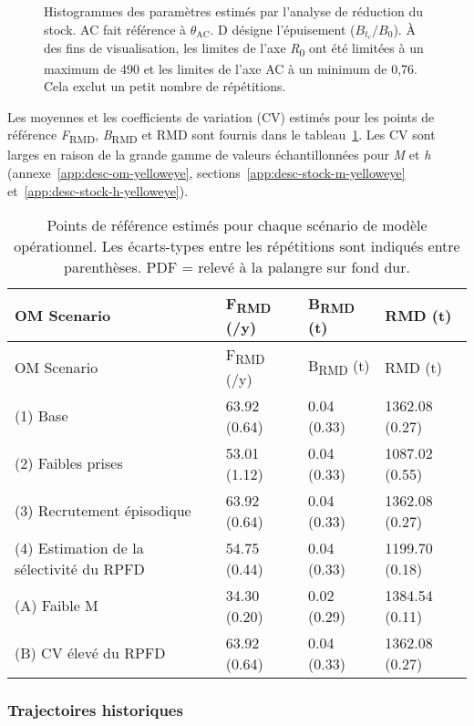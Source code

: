 \documentclass[french,11pt]{book}
\begin{document}
\begin{figure}[htb]

{\centering {} 

}

\caption{Histogrammes des paramètres estimés par l'analyse de réduction du stock. AC fait référence à \(\theta_\textrm{AC}\). D désigne l'épuisement (\(B_{t_c}/B_0\)). À des fins de visualisation, les limites de l'axe \emph{R}\textsubscript{0} ont été limitées à un maximum de 490 et les limites de l'axe AC à un minimum de 0,76. Cela exclut un petit nombre de répétitions.}\label{fig:sra-conditioned-parameters}
\end{figure}
Les moyennes et les coefficients de variation (CV) estimés pour les points de référence \emph{F}\textsubscript{RMD}, \emph{B}\textsubscript{RMD} et RMD sont fournis dans le tableau~\ref{tab:sra-ref-pts}. Les CV sont larges en raison de la grande gamme de valeurs échantillonnées pour \emph{M} et \emph{h} (annexe~\ref{app:desc-om-yelloweye}, sections~\ref{app:desc-stock-m-yelloweye} et~\ref{app:desc-stock-h-yelloweye}).
\begin{longtable}[]{@{}llll@{}}
\caption{\label{tab:sra-ref-pts}Points de référence estimés pour chaque scénario de modèle opérationnel. Les écarts-types entre les répétitions sont indiqués entre parenthèses. PDF = relevé à la palangre sur fond dur.}\tabularnewline
\toprule
OM Scenario & F\textsubscript{RMD} (/y) & B\textsubscript{RMD} (t) & RMD (t)\tabularnewline
\midrule
\endfirsthead
\toprule
OM Scenario & F\textsubscript{RMD} (/y) & B\textsubscript{RMD} (t) & RMD (t)\tabularnewline
\midrule
\endhead
(1) Base & 63.92 (0.64) & 0.04 (0.33) & 1362.08 (0.27)\tabularnewline
(2) Faibles prises & 53.01 (1.12) & 0.04 (0.33) & 1087.02 (0.55)\tabularnewline
(3) Recrutement épisodique & 63.92 (0.64) & 0.04 (0.33) & 1362.08 (0.27)\tabularnewline
(4) Estimation de la sélectivité du RPFD & 54.75 (0.44) & 0.04 (0.33) & 1199.70 (0.18)\tabularnewline
(A) Faible M & 34.30 (0.20) & 0.02 (0.29) & 1384.54 (0.11)\tabularnewline
(B) CV élevé du RPFD & 63.92 (0.64) & 0.04 (0.33) & 1362.08 (0.27)\tabularnewline
\bottomrule
\end{longtable}
\clearpage

\hypertarget{sec:approach3-conditioning-trajectories}{%
\subsubsection{Trajectoires historiques}\label{sec:approach3-conditioning-trajectories}}
\end{document}
